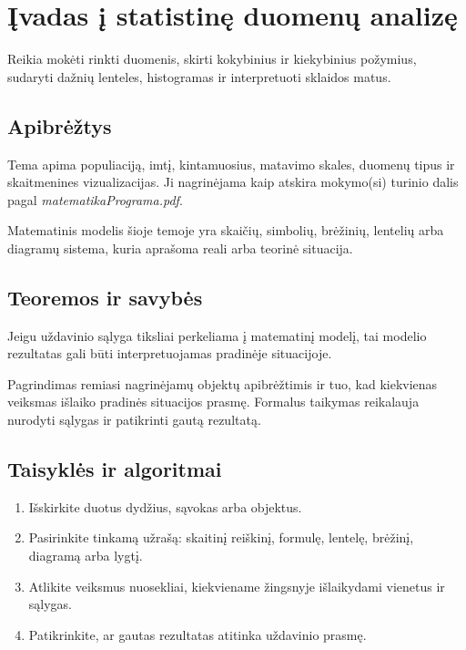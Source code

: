 \section{Įvadas į statistinę duomenų analizę}\label{sec:ivadas-i-statistine-duomenu-analize}

\begin{tcolorbox}[title=Prieš pradedant, colback=green!5]
Reikia mokėti rinkti duomenis, skirti kokybinius ir kiekybinius požymius, sudaryti dažnių lenteles, histogramas ir interpretuoti sklaidos matus.
\end{tcolorbox}
\subsection{Apibrėžtys}
\begin{apibreztis}
Tema apima populiaciją, imtį, kintamuosius, matavimo skales, duomenų tipus ir skaitmenines vizualizacijas. Ji nagrinėjama kaip atskira mokymo(si) turinio dalis pagal \emph{matematikaPrograma.pdf}.
\end{apibreztis}
\begin{apibreztis}
Matematinis modelis šioje temoje yra skaičių, simbolių, brėžinių, lentelių arba diagramų sistema, kuria aprašoma reali arba teorinė situacija.
\end{apibreztis}

\subsection{Teoremos ir savybės}
\begin{savybe}
Jeigu uždavinio sąlyga tiksliai perkeliama į matematinį modelį, tai modelio rezultatas gali būti interpretuojamas pradinėje situacijoje.
\end{savybe}
\begin{pastaba}
Pagrindimas remiasi nagrinėjamų objektų apibrėžtimis ir tuo, kad kiekvienas veiksmas išlaiko pradinės situacijos prasmę. Formalus taikymas reikalauja nurodyti sąlygas ir patikrinti gautą rezultatą.
\end{pastaba}

\subsection{Taisyklės ir algoritmai}
\begin{enumerate}[label=\arabic*.]
\item Išskirkite duotus dydžius, sąvokas arba objektus.
\item Pasirinkite tinkamą užrašą: skaitinį reiškinį, formulę, lentelę, brėžinį, diagramą arba lygtį.
\item Atlikite veiksmus nuosekliai, kiekviename žingsnyje išlaikydami vienetus ir sąlygas.
\item Patikrinkite, ar gautas rezultatas atitinka uždavinio prasmę.
\end{enumerate}

